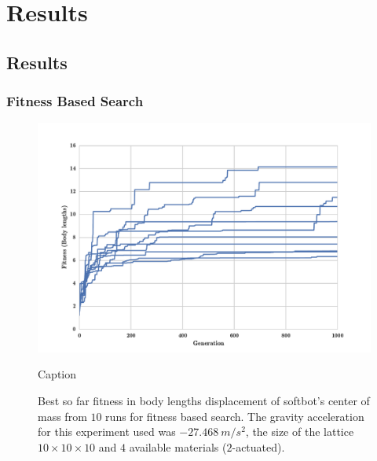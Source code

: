 
\chapter{Results} %

\label{Results} %


\section{Results}

\clearpage
\subsection{Fitness Based Search}

\begin{figure}[h!]
\centering
\includegraphics[width=1.0\textwidth]{Figures/Results/indRunsSize10Fitness.pdf}
\caption{Caption}
\caption{Best so far fitness in body lengths displacement of softbot's center of mass from $10$ runs for fitness based search. The gravity acceleration for this experiment used was $-27.468\   m/s^2$, the size of the lattice $10\times 10\times10$ and $4$ available materials ($2$-actuated).}
\end{figure}

